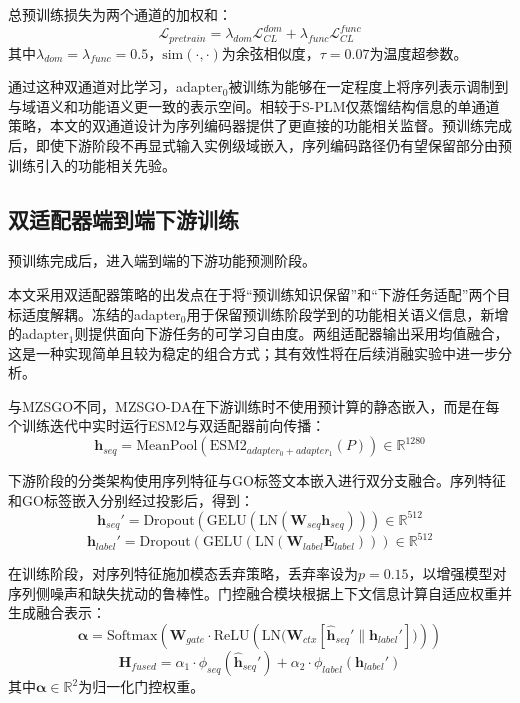 总预训练损失为两个通道的加权和：
\begin{equation}
    \mathcal{L}_{pretrain} = \lambda_{dom}\mathcal{L}_{CL}^{dom} + \lambda_{func}\mathcal{L}_{CL}^{func}
\end{equation}
其中$\lambda_{dom}=\lambda_{func}=0.5$，$\text{sim}(\cdot,\cdot)$为余弦相似度，$\tau=0.07$为温度超参数。

通过这种双通道对比学习，adapter$_0$被训练为能够在一定程度上将序列表示调制到与域语义和功能语义更一致的表示空间。相较于S-PLM\cite{wang2025splm}仅蒸馏结构信息的单通道策略，本文的双通道设计为序列编码器提供了更直接的功能相关监督。预训练完成后，即使下游阶段不再显式输入实例级域嵌入，序列编码路径仍有望保留部分由预训练引入的功能相关先验。

\subsection{双适配器端到端下游训练}

预训练完成后，进入端到端的下游功能预测阶段。

本文采用双适配器策略的出发点在于将“预训练知识保留”和“下游任务适配”两个目标适度解耦。冻结的adapter$_0$用于保留预训练阶段学到的功能相关语义信息，新增的adapter$_1$则提供面向下游任务的可学习自由度。两组适配器输出采用均值融合，这是一种实现简单且较为稳定的组合方式；其有效性将在后续消融实验中进一步分析。

与MZSGO不同，MZSGO-DA在下游训练时不使用预计算的静态嵌入，而是在每个训练迭代中实时运行ESM2与双适配器前向传播：
\begin{equation}
    \mathbf{h}_{seq} = \text{MeanPool}(\text{ESM2}_{adapter_0+adapter_1}(P)) \in \mathbb{R}^{1280}
\end{equation}

下游阶段的分类架构使用序列特征与GO标签文本嵌入进行双分支融合。序列特征和GO标签嵌入分别经过投影后，得到：
\begin{equation}
    \mathbf{h}_{seq}' = \text{Dropout}(\text{GELU}(\text{LN}(\mathbf{W}_{seq}\mathbf{h}_{seq}))) \in \mathbb{R}^{512}
\end{equation}
\begin{equation}
    \mathbf{h}_{label}' = \text{Dropout}(\text{GELU}(\text{LN}(\mathbf{W}_{label}\mathbf{E}_{label}))) \in \mathbb{R}^{512}
\end{equation}

在训练阶段，对序列特征施加模态丢弃策略，丢弃率设为$p=0.15$，以增强模型对序列侧噪声和缺失扰动的鲁棒性。门控融合模块根据上下文信息计算自适应权重并生成融合表示：
\begin{equation}
    \boldsymbol{\alpha} =
    \text{Softmax}
    \left(
    \mathbf{W}_{gate}\cdot
    \text{ReLU}
    \left(
    \text{LN}\big(\mathbf{W}_{ctx}[\hat{\mathbf{h}}_{seq}' \parallel \mathbf{h}_{label}']\big)
    \right)
    \right)
\end{equation}
\begin{equation}
    \mathbf{H}_{fused} = \alpha_1 \cdot \phi_{seq}(\hat{\mathbf{h}}_{seq}') + \alpha_2 \cdot \phi_{label}(\mathbf{h}_{label}')
\end{equation}
其中$\boldsymbol{\alpha}\in\mathbb{R}^{2}$为归一化门控权重。

